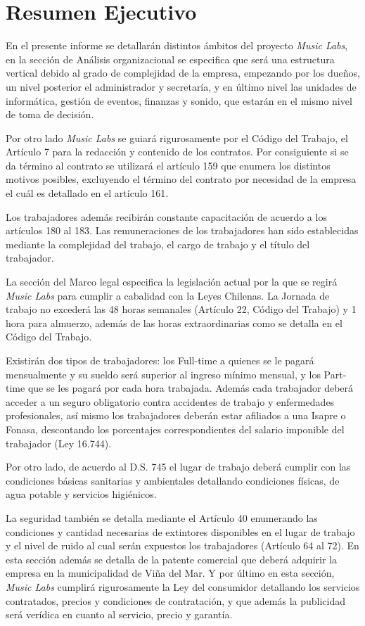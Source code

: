 \section{Resumen Ejecutivo}

En el presente informe se detallarán distintos ámbitos del proyecto \emph{Music Labs},
en la sección de Análisis organizacional se especifica que será una estructura
vertical debido al grado de complejidad de la empresa, empezando por los dueños,
un nivel posterior el administrador y secretaría, y en último nivel las unidades
de informática, gestión de eventos, finanzas y sonido, que estarán en el mismo
nivel de toma de decisión.

Por otro lado \emph{Music Labs} se guiará rigurosamente por el Código del Trabajo,
el Artículo 7 para la redacción y contenido de los contratos.
Por consiguiente si se da término al contrato se utilizará el artículo 159 que
enumera los distintos motivos posibles, excluyendo el término del contrato por
necesidad de la empresa el cuál es detallado en el artículo 161.

Los trabajadores además recibirán constante capacitación de acuerdo a los artículos
180 al 183.
Las remuneraciones de los trabajadores han sido establecidas mediante
la complejidad del trabajo, el cargo de trabajo y el título del trabajador.

La sección del Marco legal especifica la legislación actual por la que se regirá
\emph{Music Labs} para cumplir a cabalidad con la Leyes Chilenas.
La Jornada de trabajo no excederá las 48 horas semanales (Artículo 22, Código
del Trabajo) y 1 hora para almuerzo, además de las horas extraordinarias como
se detalla en el Código del Trabajo.

Existirán dos tipos de trabajadores: los Full-time a quienes se le pagará mensualmente y su
sueldo será superior al ingreso mínimo mensual, y los Part-time que se les pagará por cada
hora trabajada.
Además cada trabajador deberá acceder a un seguro obligatorio contra
accidentes de trabajo y enfermedades profesionales, así mismo los trabajadores deberán
estar afiliados a una Isapre o Fonasa, descontando los porcentajes correspondientes del
salario imponible del trabajador (Ley 16.744).

Por otro lado, de acuerdo al D.S. 745 el lugar de trabajo deberá cumplir con las
condiciones básicas sanitarias y ambientales detallando condiciones físicas,
de agua potable y servicios higiénicos.

La seguridad también se detalla mediante el Artículo 40 enumerando las condiciones y cantidad
necesarias de extintores disponibles en el lugar de trabajo y el nivel de ruido al cual serán
expuestos los trabajadores (Artículo 64 al 72).
En esta sección además se detalla de la patente comercial que deberá adquirir la empresa en
la municipalidad de Viña del Mar.
Y por último en esta sección, \emph{Music Labs} cumplirá rigurosamente la Ley del consumidor
detallando los servicios contratados, precios y condiciones de contratación, y que además
la publicidad será verídica en cuanto al servicio, precio y garantía.

